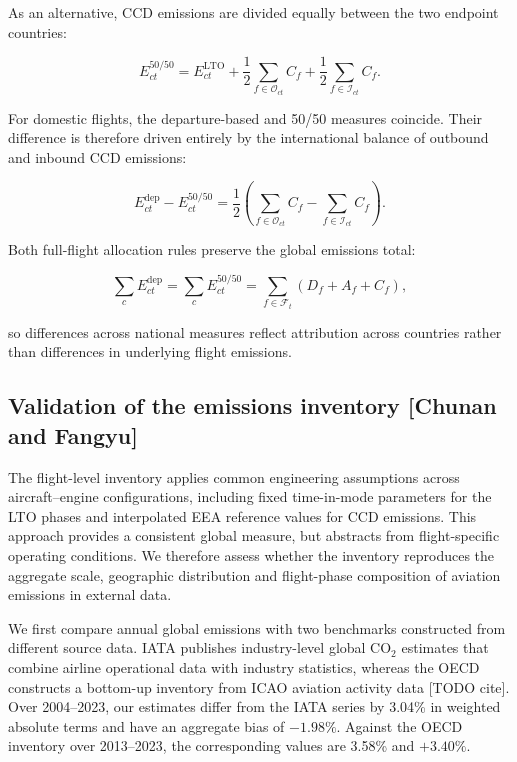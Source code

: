 \documentclass[12pt]{article}
\begin{document}
As an alternative, CCD emissions are divided equally between the two endpoint countries:

\begin{equation}
E_{ct}^{50/50}
=
E_{ct}^{\mathrm{LTO}}
+
\frac{1}{2}
\sum_{f\in\mathcal O_{ct}}C_f
+
\frac{1}{2}
\sum_{f\in\mathcal I_{ct}}C_f.
\label{eq:nature_9}
\end{equation}

For domestic flights, the departure-based and 50/50 measures coincide. Their difference is therefore driven entirely by the international balance of outbound and inbound CCD emissions:

\begin{equation}
E_{ct}^{\mathrm{dep}}-E_{ct}^{50/50}
=
\frac{1}{2}
\left(
\sum_{f\in\mathcal O_{ct}}C_f
-
\sum_{f\in\mathcal I_{ct}}C_f
\right).
\label{eq:nature_10}
\end{equation}

Both full-flight allocation rules preserve the global emissions total:

\begin{equation}
\sum_c E_{ct}^{\mathrm{dep}}
=
\sum_c E_{ct}^{50/50}
=
\sum_{f\in\mathcal F_t}(D_f+A_f+C_f),
\label{eq:nature_11}
\end{equation}

so differences across national measures reflect attribution across countries rather than differences in underlying flight emissions.

\subsection*{Validation of the emissions inventory [Chunan and Fangyu]}

The flight-level inventory applies common engineering assumptions across
aircraft--engine configurations, including fixed time-in-mode parameters for
the LTO phases and interpolated EEA reference values for CCD emissions. This
approach provides a consistent global measure, but abstracts from
flight-specific operating conditions. We therefore assess whether the
inventory reproduces the aggregate scale, geographic distribution and
flight-phase composition of aviation emissions in external data.

We first compare annual global emissions with two benchmarks constructed from
different source data. IATA publishes industry-level global CO$_2$ estimates
that combine airline operational data with industry statistics, whereas the
OECD constructs a bottom-up inventory from ICAO aviation activity data
[TODO cite]. Over 2004--2023, our estimates differ from the IATA series by
3.04\% in weighted absolute terms and have an aggregate bias of
\(-1.98\%\). Against the OECD inventory over 2013--2023, the corresponding
values are 3.58\% and \(+3.40\%\).
\end{document}

